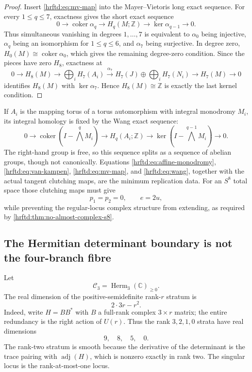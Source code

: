 \begin{proof}
Insert \eqref{hrftd:eq:mv-map} into the Mayer--Vietoris long exact sequence.
For every \(1\le q\le7\), exactness gives the short exact sequence
\[
 0\longrightarrow\operatorname{coker}\alpha_q
 \longrightarrow H_q(M;\mathbb Z)
 \longrightarrow\ker\alpha_{q-1}
 \longrightarrow0.
\]
Thus simultaneous vanishing in degrees \(1,\ldots,7\) is equivalent to
\(\alpha_0\) being injective, \(\alpha_q\) being an isomorphism for
\(1\le q\le6\), and \(\alpha_7\) being surjective.  In degree zero,
\(H_0(M)\cong\operatorname{coker}\alpha_0\), which gives the remaining
degree-zero condition.  Since the pieces have zero \(H_8\), exactness at
\[
 0\longrightarrow H_8(M)\longrightarrow
 \bigoplus_iH_7(A_i)\xrightarrow{\alpha_7}
 H_7(J)\oplus\bigoplus_iH_7(N_i)\longrightarrow H_7(M)
 \longrightarrow0
\]
identifies \(H_8(M)\) with \(\ker\alpha_7\).  Hence
\(H_8(M)\cong\mathbb Z\) is exactly the last kernel condition.
\end{proof}

If \(A_i\) is the mapping torus of a torus automorphism with integral
monodromy \(M_i\), its integral homology is fixed by the Wang exact sequence:
\begin{equation}
 0\longrightarrow
 \operatorname{coker}\left(I-\bigwedge^qM_i\right)
 \longrightarrow H_q(A_i;\mathbb Z)
 \longrightarrow
 \ker\left(I-\bigwedge^{q-1}M_i\right)
 \longrightarrow0.
 \label{hrftd:eq:wang}
\end{equation}
The right-hand group is free, so this sequence splits as a sequence of
abelian groups, though not canonically.  Equations
\eqref{hrftd:eq:affine-monodromy},
\eqref{hrftd:eq:van-kampen}, \eqref{hrftd:eq:mv-map}, and
\eqref{hrftd:eq:wang}, together with the actual tangent clutching maps, are
the minimum replication data.  For an \(S^8\) total space those clutching
maps must give
\[
 p_1=p_2=0,\qquad e=2u,
\]
while preventing the regular-locus complex structure from extending, as
required by \cref{hrftd:thm:no-almost-complex-s8}.

\subsection{The Hermitian determinant boundary is not the four-branch fibre}
\label{hrftd:hermitian}

Let
\[
 \mathcal C_3=\operatorname{Herm}_3(\mathbb C)_{\ge0}.
\]
The real dimension of the positive-semidefinite rank-\(r\) stratum is
\[
 2\cdot3r-r^2.
\]
Indeed, write \(H=BB^*\) with \(B\) a full-rank complex
\(3\times r\) matrix; the entire redundancy is the right action of
\(U(r)\).  Thus the rank \(3,2,1,0\) strata have real dimensions
\begin{equation}
 9,\quad8,\quad5,\quad0.
 \label{hrftd:eq:rank-dimensions}
\end{equation}
The rank-two stratum is smooth because the derivative of the determinant is
the trace pairing with \(\operatorname{adj}(H)\), which is nonzero exactly
in rank two.  The singular locus is the rank-at-most-one locus.

